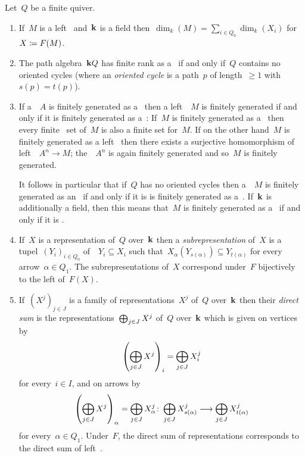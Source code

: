\begin{remark}
  Let~$Q$ be a finite quiver.
  \begin{enumerate}
    \item
      If~$M$ is a left~{} and~{$\kf$} is a field then~$\dim_k(M) = \sum_{i \in Q_0} \dim_k(X_i)$ for~$X \coloneqq F(M)$.
    \item
      The path algebra~$\mathbf{k} Q$ has finite rank as a~{\module{$\kf$}} if and only if~$Q$ contains no oriented cycles (where an \emph{oriented cycle} is a path~$p$ of length~$\geq 1$ with~$s(p) = t(p)$).
    \item
      If a~{\kalg}~$A$ is finitely generated as a~{\module{$\kf$}} then a left~{}~$M$ is finitely generated if and only if it is finitely generated as a~{\module{$\kf$}}:
      If~$M$ is finitely generated as a~{\module{$\kf$}} then every finite~ set of~$M$ is also a finite  set for~$M$.
      If on the other hand~$M$ is finitely generated as a left~{} then there exists a surjective homomorphism of left~{}~$A^n \to M$;
      the~{}~$A^n$ is again finitely generated and so~$M$ is finitely generated.
      
      It follows in particular that if~$Q$ has no oriented cycles then a~{}~$M$ is finitely generated as an~{} if and only if it is is finitely generated as a~{\module{$\kf$}}.
      If~$\kf$ is additionally a field, then this means that~$M$ is finitely generated as a~{} if and only if it is {\fd}.
    \item
      If~$X$ is a representation of~$Q$ over~$\kf$ then a \emph{subrepresentation} of~$X$ is a tupel~$(Y_i)_{i \in Q_0}$ of~{\submodules{$\kf$}}~$Y_i \subseteq X_i$ such that~$X_\alpha( Y_{s(\alpha)} ) \subseteq Y_{t(\alpha)}$ for every arrow~$\alpha \in Q_1$.
      The subrepresentations of~$X$ correspond under~$F$ bijectively to the left {} of~$F(X)$.
    \item
      If~$(X^j)_{j \in J}$ is a family of representations~$X^j$ of~$Q$ over~$\kf$ then their \emph{direct sum} is the representations~$\bigoplus_{j \in J} X^j$ of~$Q$ over~$\kf$ which is given on vertices by
      \[
          \left( \bigoplus_{j \in J} X^j \right)_i
        = \bigoplus_{j \in J} X^j_i
      \]
      for every~$i \in I$, and on arrows by
      \[
                \left( \bigoplus_{j \in J} X^j \right)_\alpha
        =       \bigoplus_{j \in J} X^j_\alpha
        \colon  \bigoplus_{j \in J} X^j_{s(\alpha)}
        \longrightarrow \bigoplus_{j \in J} X^j_{t(\alpha)}
      \]
      for every~$\alpha \in Q_1$.
      Under~$F$, the direct sum of representations corresponds to the direct sum of left~{}.
  \end{enumerate}
\end{remark}




